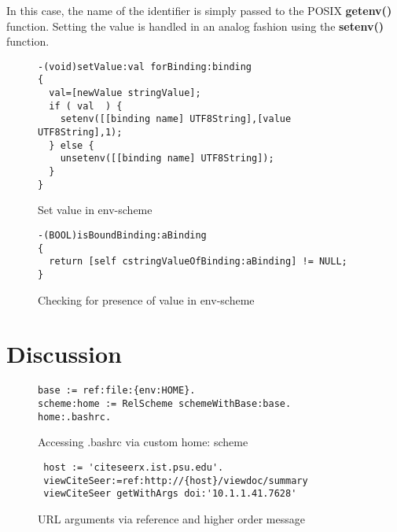 \documentclass[preprint,authoryear]{acm_proc_article-sp}
\begin{document}
In this case, the name of the identifier is simply passed to the POSIX {\bf getenv()} function.
Setting the value is handled in an analog fashion using the {\bf setenv()} function.



\begin{figure}[htbp]
\begin{center}
\begin{verbatim}
-(void)setValue:val forBinding:binding
{
  val=[newValue stringValue];
  if ( val  ) {
    setenv([[binding name] UTF8String],[value UTF8String],1);
  } else {
    unsetenv([[binding name] UTF8String]);
  }
}
\end{verbatim}
\caption{Set value in env-scheme}
\label{setvalue-env}
\end{center}
\end{figure}

\begin{figure}[htbp]
\begin{center}
\begin{verbatim}
-(BOOL)isBoundBinding:aBinding
{
  return [self cstringValueOfBinding:aBinding] != NULL;
}
\end{verbatim}
\caption{Checking for presence of value in env-scheme}
\label{hasValue-env}
\end{center}
\end{figure}



\section{Discussion}



\begin{figure}[htbp]
\begin{center}
\begin{verbatim}
base := ref:file:{env:HOME}.
scheme:home := RelScheme schemeWithBase:base.
home:.bashrc.
\end{verbatim}
\caption{Accessing .bashrc via custom home: scheme}
\label{rfc-scheme}
\end{center}
\end{figure}




\begin{figure}[htbp]
\begin{center}
\begin{verbatim}
 host := 'citeseerx.ist.psu.edu'.
 viewCiteSeer:=ref:http://{host}/viewdoc/summary
 viewCiteSeer getWithArgs doi:'10.1.1.41.7628'
\end{verbatim}
\caption{URL arguments via reference and higher order message}
\label{url-args}
\end{center}
\end{figure}
\end{document}
